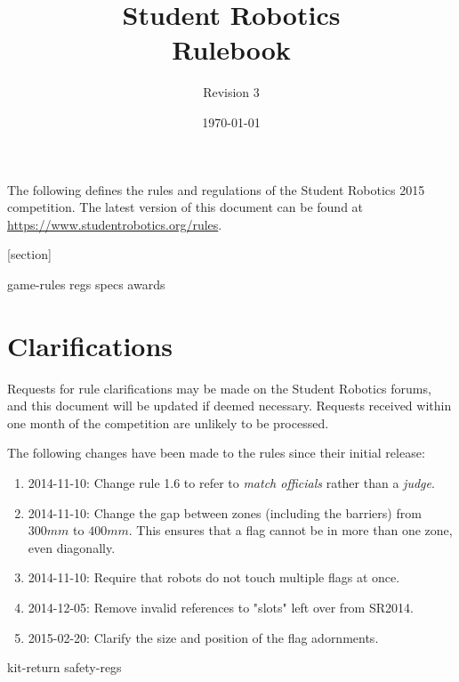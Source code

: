 \documentclass[a4paper, 11pt]{scrartcl}
\title {Student Robotics \sryear\\ Rulebook}
\author{Revision 3}
\date{\today}
\newcommand{\sryear}{2015}
\begin{document}
\maketitle

\noindent The following defines the rules and regulations of the Student Robotics \sryear {} competition.  The latest version of this document can be found at \url{https://www.studentrobotics.org/rules}.

[section]
\newcommand{\rcn}{\stepcounter{rule}\arabic{section}.\arabic{rule}}
\renewcommand{\labelenumi}{\rcn}

 {game-rules}
\newpage
 {regs}
\newpage
 {specs}
\newpage
 {awards}

\renewcommand{\labelenumi}{\rcn}

\section{Clarifications}
Requests for rule clarifications may be made on the Student Robotics forums, and this document will be updated if deemed necessary.  Requests received within one month of the competition are unlikely to be processed.

The following changes have been made to the rules since their initial release:

\begin{enumerate}
  \item 2014-11-10: Change rule 1.6 to refer to \emph{match officials} rather than a \emph{judge}.
  \item 2014-11-10: Change the gap between zones (including the barriers) from $300mm$ to $400mm$.
                    This ensures that a flag cannot be in more than one zone, even diagonally.
  \item 2014-11-10: Require that robots do not touch multiple flags at once.
  \item 2014-12-05: Remove invalid references to "slots" left over from SR2014.
  \item 2015-02-20: Clarify the size and position of the flag adornments.
\end{enumerate}

\newpage
\appendix
\appendixpage
\addappheadtotoc
 {kit-return}
 {safety-regs}
\end{document}
